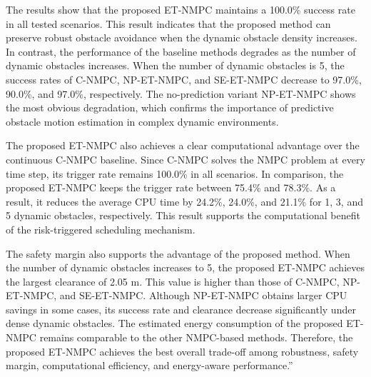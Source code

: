\documentclass[12pt, twosides]{article}
\theoremstyle{definition}
\begin{document}
The results show that the proposed ET-NMPC maintains a 100.0\% success rate in all tested scenarios. This result indicates that the proposed method can preserve robust obstacle avoidance when the dynamic obstacle density increases. In contrast, the performance of the baseline methods degrades as the number of dynamic obstacles increases. When the number of dynamic obstacles is 5, the success rates of C-NMPC, NP-ET-NMPC, and SE-ET-NMPC decrease to 97.0\%, 90.0\%, and 97.0\%, respectively. The no-prediction variant NP-ET-NMPC shows the most obvious degradation, which confirms the importance of predictive obstacle motion estimation in complex dynamic environments.

The proposed ET-NMPC also achieves a clear computational advantage over the continuous C-NMPC baseline. Since C-NMPC solves the NMPC problem at every time step, its trigger rate remains 100.0\% in all scenarios. In comparison, the proposed ET-NMPC keeps the trigger rate between 75.4\% and 78.3\%. As a result, it reduces the average CPU time by 24.2\%, 24.0\%, and 21.1\% for 1, 3, and 5 dynamic obstacles, respectively. This result supports the computational benefit of the risk-triggered scheduling mechanism.

The safety margin also supports the advantage of the proposed method. When the number of dynamic obstacles increases to 5, the proposed ET-NMPC achieves the largest clearance of 2.05 m. This value is higher than those of C-NMPC, NP-ET-NMPC, and SE-ET-NMPC. Although NP-ET-NMPC obtains larger CPU savings in some cases, its success rate and clearance decrease significantly under dense dynamic obstacles. The estimated energy consumption of the proposed ET-NMPC remains comparable to the other NMPC-based methods. Therefore, the proposed ET-NMPC achieves the best overall trade-off among robustness, safety margin, computational efficiency, and energy-aware performance.'' 
\end{document}
